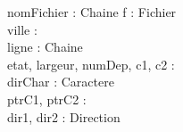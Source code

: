 \begin{algorithme}
        {nomFichier : Chaine}
        {}
        {f : Fichier \\ ville :  \\ ligne : Chaine \\ etat, largeur, numDep, c1, c2 : \naturel \\ dirChar : Caractere \\ ptrC1, ptrC2 :  \\ dir1, dir2 : Direction}
        {
            {
                \retourner{\motclefPointeurNULL}
            }


            {
                 {\continuer}
                 {\sortirBoucle}

}}
\end{algorithme}
